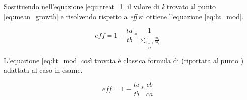 \documentclass[a4paper,11pt]{article}
\begin{document}
Sostituendo nell'equazione \ref{equ:treat_1} il valore di \textit{k} trovato al punto \ref{eq:mean_growth} e risolvendo rispetto a \textit{eff} si ottiene l'equazione \ref{eq:ht_mod}.
\begin{center}
\begin{equation}
eff = 1-\frac{ta}{tb}*\frac{1}{\frac{\sum_{i=1}^{n} \frac{ca_i}{cb_i}}{n}}
\label{eq:ht_mod}
\end{equation}
\end{center}
L'equazione \ref{eq:ht_mod} così trovata è classica formula di \citet{henderson_tests_1955} (riportata al punto ) adattata al caso in esame.
\begin{center}
\begin{equation}
eff = 1-\frac{ta}{tb}*\frac{cb}{ca}
\label{eq:ht_mod}
\end{equation}
\end{center}
\end{document}
